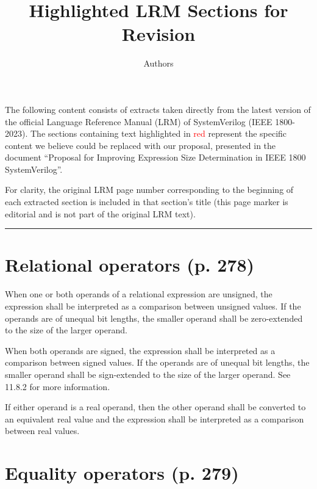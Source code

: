 \documentclass{article}
\title{Highlighted LRM Sections for Revision}
\author{Authors}
\date{}
\begin{document}
\maketitle

The following content consists of extracts taken directly from the latest
version of the official Language Reference Manual (LRM) of SystemVerilog
(IEEE 1800-2023). The sections containing text highlighted in
\textcolor{red}{red} represent the specific content we believe could be replaced
with our proposal, presented in the document
``Proposal for Improving Expression Size Determination in IEEE 1800 SystemVerilog''.

For clarity, the original LRM page number corresponding to the beginning of each
extracted section is included in that section's title (this page marker is
editorial and is not part of the original LRM text).

\begin{center}
\noindent\rule{.8\textwidth}{1pt}  
\end{center}

\renewcommand{\thesection}{11.4.\arabic{section}}
\setcounter{section}{3}

\section{Relational operators (p. 278)}

\textelp{}

When one or both operands of a relational expression are unsigned, the
expression shall be interpreted as a comparison between unsigned values.
  {
    \color{red}
    If the operands are of unequal bit lengths, the smaller operand
    shall be zero-extended to the size of the larger operand.
  }

When both operands are signed, the expression shall be interpreted as a
comparison between signed values.
  {
    \color{red}
    If the operands are of unequal bit
    lengths, the smaller operand shall be sign-extended to the size of the larger
    operand. See 11.8.2 for more information.
  }

If either operand is a real operand, then the other operand shall be converted to
an equivalent real value and the expression shall be interpreted as a comparison
between real values.

\textelp{}

\section{Equality operators (p. 279)}
\end{document}
